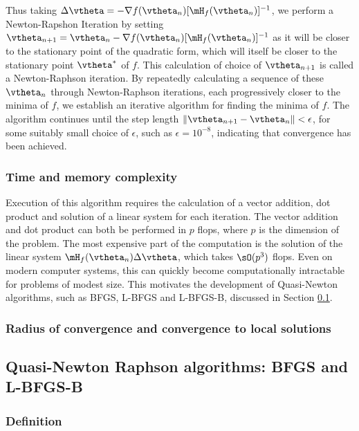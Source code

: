 Thus taking $\Delta \vtheta = -\nabla f(\vtheta_n) [\mH_f(\vtheta_n)]^{-1}$, we perform a Newton-Rapshon
Iteration by setting $\vtheta_{n + 1} = \vtheta_{n} - \nabla f(\vtheta_n) [\mH_f(\vtheta_n)]^{-1}$ as it will
be closer to the stationary point of the quadratic form, which will itself be closer to the stationary point
$\vtheta^*$ of $f$. This calculation of choice of $\vtheta_{n+1}$ is called a Newton-Raphson iteration. By
repeatedly calculating a sequence of these $\vtheta_n$ through Newton-Raphson iterations, each progressively
closer to the minima of $f$, we establish an iterative algorithm for finding the minima of $f$. The algorithm
continues until the step length $\| \vtheta_{n+1} - \vtheta_{n} \| < \epsilon$, for some suitably small choice
of $\epsilon$, such as $\epsilon = 10^{-8}$, indicating that convergence has been achieved.

\subsubsection{Time and memory complexity}

Execution of this algorithm requires the calculation of a vector addition, dot product and solution of a
linear system for each iteration. The vector addition and dot product can both be performed in $p$ flops,
where $p$ is the dimension of the problem. The most expensive part of the computation is the solution of the
linear system $\mH_f(\vtheta_n) \Delta \vtheta$, which takes $\sO(p^3)$ flops. Even on modern computer
systems, this can quickly become computationally intractable for problems of modest size. This motivates the
development of Quasi-Newton algorithms, such as BFGS, L-BFGS and L-BFGS-B, discussed in Section
\ref{sec:quasi_newton}.

\subsubsection{Radius of convergence and convergence to local solutions}

\subsection{Quasi-Newton Raphson algorithms: BFGS and L-BFGS-B}
\label{sec:quasi_newton}

\subsubsection{Definition}

